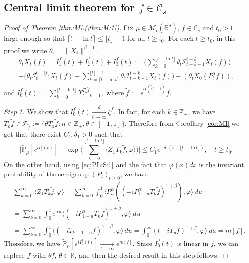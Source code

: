 \documentclass[EJP]{ejpecp} %
\begin{document}
\subsection{Central limit theorem for $f\in \mathcal C_s$}
\label{sec: small rate}

\begin{proof}[Proof of Theorem \ref{thm:M}.(\ref{thm:M:1})]
	Fix $\mu\in \mathcal M_c(\mathbb R^d)$, $f\in \mathcal C_s$ and $t_0 > 1$  large enough so that $ \lceil t - \ln t\rceil \leq \lfloor t \rfloor - 1$ for all $t\geq t_0$.
  	For each $t\geq t_0$, in this proof we write $\theta_t = \|X_t\|^{\tilde \beta - 1}$,
\begin{multline}
    \label{eq:PM:CLTS:1}
    \theta_t  X_t(f)
    = I^f_1(t) + I^f_2(t) + I^f_3(t)
    := \Big(\sum_{k=0}^{\lfloor t-\ln t \rfloor} \theta_t \mathcal I_{t-k-1}^{t-k} X_t(f) \Big)\\
    + \Big( \theta_t \mathcal I_0^{t-\lfloor t \rfloor} X_t(f)   + \sum_{k=\lceil t-\ln t \rceil}^{\lfloor t \rfloor-1} \theta_t \mathcal I_{t-k-1}^{t-k} X_t(f) \Big) + (\theta_t X_0(P_t^\alpha f) ),
\end{multline}
	and $ I^f_0(t) := \sum_{k=0}^{\lfloor t-\ln t \rfloor} \Upsilon_{t-k-1}^{T_k \tilde f},$ where $\tilde f:= e^{\alpha(\tilde \beta - 1)} f$.

	\emph{Step 1.} We show that $I^f_0(t) \xrightarrow[t\to \infty]{d} \zeta^f$.
	In fact, for each $k \in \mathbb Z_+$, we have  $T_{k} \tilde f \in \mathcal P_{\tilde f}:=\{\theta T_n \tilde f: n \in \mathbb Z_+, \theta \in [-1,1]\}$.
	Therefore from Corollary \ref{cor:MI} we get that there exist $C_1,\delta_1 > 0$ such that
\[
  	\Big|\mathbb{\widetilde{P}}_{\mu} [e^{i I^f_0(t)} ]-\exp\Big(\sum_{k=0}^{\lfloor t-\ln t \rfloor} \langle Z_1T_{k}\tilde f, \varphi\rangle \Big)\Big|
    \leq C_1 e^{-\delta_1(t - \lfloor t - \ln t\rfloor)},
    \quad t\geq t_0.
\]
	On the other hand, using \eqref{eq:PL:S:1} and the fact that $\varphi(x)dx$ is the invariant probability of the semigroup $(P_t)_{t\geq 0}$, we have
\begin{align}
\label{eq:PM:CLTS:2}
    & \sum_{k=0}^\infty \langle Z_1 T_{k} \tilde f, \varphi \rangle
    = \sum_{k=0}^\infty \int_0^1 \langle P_u^\alpha ((-iP_{1 - u}^\alpha T_k \tilde f)^{1+\beta}), \varphi\rangle ~du
    \\& = \sum_{k=0}^\infty \int_0^1 e^{\alpha u} \langle  (-iP_{1 - u}^\alpha T_{k}\tilde f)^{1+\beta}, \varphi \rangle ~du
    \\& = \sum_{k=0}^\infty \int_0^1 \langle  (-iT_{k+1 - u} f)^{1+\beta}, \varphi\rangle~du
    = \int_0^\infty \langle  (-iT_{u} f)^{1+\beta}, \varphi\rangle~du = m[f].
\end{align}
	Therefore, we have $\mathbb{\widetilde{P}}_{\mu} [e^{i I^f_0(t)} ] \xrightarrow[t\to \infty]{} e^{m[f]}$. Since $I_0^f(t)$ is linear in $f$, we can replace $f$ with $\theta f$, $\theta \in \mathbb R$, and then the desired result in this step follows.


\end{proof}
\end{document}
